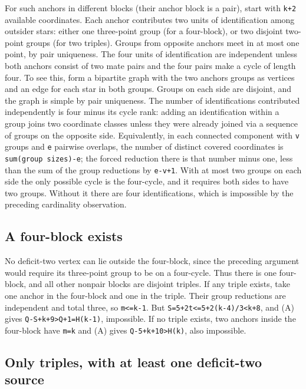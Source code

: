 \documentclass[11pt,letterpaper]{article}
\begin{document}
For such anchors in different blocks (their anchor block is a pair),
start with \texttt{k+2} available coordinates. Each anchor contributes
two units of identification among outsider stars: either one three-point
group (for a four-block), or two disjoint two-point groups (for two
triples). Groups from opposite anchors meet in at most one point, by
pair uniqueness. The four units of identification are independent unless
both anchors consist of two mate pairs and the four pairs make a cycle
of length four. To see this, form a bipartite graph with the two
anchors\textquotesingle{} groups as vertices and an edge for each star
in both groups. Groups on each side are disjoint, and the graph is
simple by pair uniqueness. The number of identifications contributed
independently is four minus its cycle rank: adding an identification
within a group joins two coordinate classes unless they were already
joined via a sequence of groups on the opposite side. Equivalently, in
each connected component with \texttt{v} groups and \texttt{e} pairwise
overlaps, the number of distinct covered coordinates is
\texttt{sum(group\ sizes)-e}; the forced reduction there is that number
minus one, less than the sum of the group reductions by \texttt{e-v+1}.
With at most two groups on each side the only possible cycle is the
four-cycle, and it requires both sides to have two groups. Without it
there are four identifications, which is impossible by the preceding
cardinality observation.

\subsection{A four-block exists}\label{a-four-block-exists}

No deficit-two vertex can lie outside the four-block, since the
preceding argument would require its three-point group to be on a
four-cycle. Thus there is one four-block, and all other nonpair blocks
are disjoint triples. If any triple exists, take one anchor in the
four-block and one in the triple. Their group reductions are independent
and total three, so \texttt{m\textless{}=k-1}. But
\texttt{S=5+2t\textless{}=5+2(k-4)/3\textless{}k+8}, and (A) gives
\texttt{Q-S+k+9\textgreater{}Q+1=H(k-1)}, impossible. If no triple
exists, two anchors inside the four-block have \texttt{m=k} and (A)
gives \texttt{Q-5+k+10\textgreater{}H(k)}, also impossible.

\subsection{Only triples, with at least one deficit-two
source}\label{only-triples-with-at-least-one-deficit-two-source}
\end{document}
